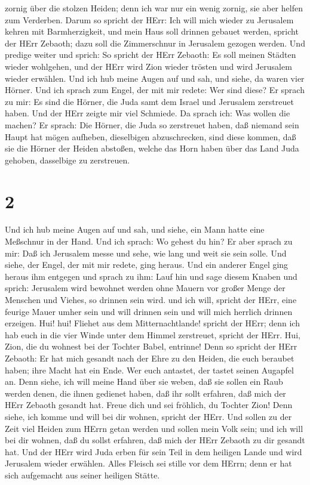 zornig über die stolzen Heiden; denn ich war nur ein wenig zornig, sie
aber helfen zum Verderben.  Darum so spricht der HErr: Ich
will mich wieder zu Jerusalem kehren mit Barmherzigkeit, und mein Haus
soll drinnen gebauet werden, spricht der HErr Zebaoth; dazu soll die
Zimmerschnur in Jerusalem gezogen werden.  Und predige
weiter und sprich: So spricht der HErr Zebaoth: Es soll meinen Städten
wieder wohlgehen, und der HErr wird Zion wieder trösten und wird
Jerusalem wieder erwählen.  Und ich hub meine Augen auf und
sah, und siehe, da waren vier Hörner.  Und ich sprach zum
Engel, der mit mir redete: Wer sind diese? Er sprach zu mir: Es sind die
Hörner, die Juda samt dem Israel und Jerusalem zerstreuet haben.
 Und der HErr zeigte mir viel Schmiede.  Da
sprach ich: Was wollen die machen? Er sprach: Die Hörner, die Juda so
zerstreuet haben, daß niemand sein Haupt hat mögen aufheben, dieselbigen
abzuschrecken, sind diese kommen, daß sie die Hörner der Heiden
abstoßen, welche das Horn haben über das Land Juda gehoben, dasselbige
zu zerstreuen.

\hypertarget{section-1}{%
\section{2}\label{section-1}}

 Und ich hub meine Augen auf und sah, und siehe, ein Mann
hatte eine Meßschnur in der Hand.  Und ich sprach: Wo gehest
du hin? Er aber sprach zu mir: Daß ich Jerusalem messe und sehe, wie
lang und weit sie sein solle.  Und siehe, der Engel, der mit
mir redete, ging heraus. Und ein anderer Engel ging heraus ihm entgegen
 und sprach zu ihm: Lauf hin und sage diesem Knaben und
sprich: Jerusalem wird bewohnet werden ohne Mauern vor großer Menge der
Menschen und Viehes, so drinnen sein wird.  und ich will,
spricht der HErr, eine feurige Mauer umher sein und will drinnen sein
und will mich herrlich drinnen erzeigen.  Hui! hui! Fliehet
aus dem Mitternachtlande! spricht der HErr; denn ich hab euch in die
vier Winde unter dem Himmel zerstreuet, spricht der HErr. 
Hui, Zion, die du wohnest bei der Tochter Babel, entrinne! 
Denn so spricht der HErr Zebaoth: Er hat mich gesandt nach der Ehre zu
den Heiden, die euch beraubet haben; ihre Macht hat ein Ende. Wer euch
antastet, der tastet seinen Augapfel an.  Denn siehe, ich
will meine Hand über sie weben, daß sie sollen ein Raub werden denen,
die ihnen gedienet haben, daß ihr sollt erfahren, daß mich der HErr
Zebaoth gesandt hat.  Freue dich und sei fröhlich, du
Tochter Zion! Denn siehe, ich komme und will bei dir wohnen, spricht der
HErr.  Und sollen zu der Zeit viel Heiden zum HErrn getan
werden und sollen mein Volk sein; und ich will bei dir wohnen, daß du
sollst erfahren, daß mich der HErr Zebaoth zu dir gesandt hat.
 Und der HErr wird Juda erben für sein Teil in dem heiligen
Lande und wird Jerusalem wieder erwählen.  Alles Fleisch
sei stille vor dem HErrn; denn er hat sich aufgemacht aus seiner
heiligen Stätte.

